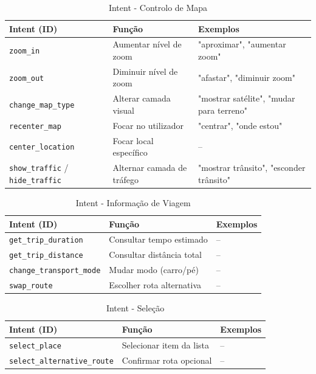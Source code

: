 \documentclass{report}
\begin{document}
\begin{longtable}{p{} p{} p{}}
    \caption{Intent - Controlo de Mapa} 
    \label{tab:intents_controlo_mapa} \\
    
    \toprule
    \textbf{Intent (ID)} & \textbf{Função} & \textbf{Exemplos} \\
    \midrule
    \endfirsthead
    \endlastfoot
    
    \texttt{zoom\_in} & Aumentar nível de zoom & "aproximar", "aumentar zoom" \\
    \texttt{zoom\_out} & Diminuir nível de zoom & "afastar", "diminuir zoom" \\
    \texttt{change\_map\_type} & Alterar camada visual & "mostrar satélite", "mudar para terreno" \\
    \texttt{recenter\_map} & Focar no utilizador & "centrar", "onde estou" \\
    \texttt{center\_location} & Focar local específico & -- \\
    \texttt{show\_traffic} / \texttt{hide\_traffic} & Alternar camada de tráfego & "mostrar trânsito", "esconder trânsito" \\
\end{longtable}


\begin{longtable}{p{} p{} p{}}
    \caption{Intent - Informação de Viagem} 
    \label{tab:intents_informacao_viagem} \\
    
    \toprule
    \textbf{Intent (ID)} & \textbf{Função} & \textbf{Exemplos} \\
    \midrule
    \endfirsthead
    \endlastfoot
    
    \texttt{get\_trip\_duration} & Consultar tempo estimado & -- \\
    \texttt{get\_trip\_distance} & Consultar distância total & -- \\
    \texttt{change\_transport\_mode} & Mudar modo (carro/pé) & -- \\
    \texttt{swap\_route} & Escolher rota alternativa & -- \\
\end{longtable}


\begin{longtable}{p{} p{} p{}}
    \caption{Intent - Seleção} 
    \label{tab:intents_selecao} \\
    
    \toprule
    \textbf{Intent (ID)} & \textbf{Função} & \textbf{Exemplos} \\
    \midrule
    \endfirsthead
    \endlastfoot

    \texttt{select\_place} & Selecionar item da lista & -- \\
    \texttt{select\_alternative\_route} & Confirmar rota opcional & -- \\
\end{longtable}
\end{document}
